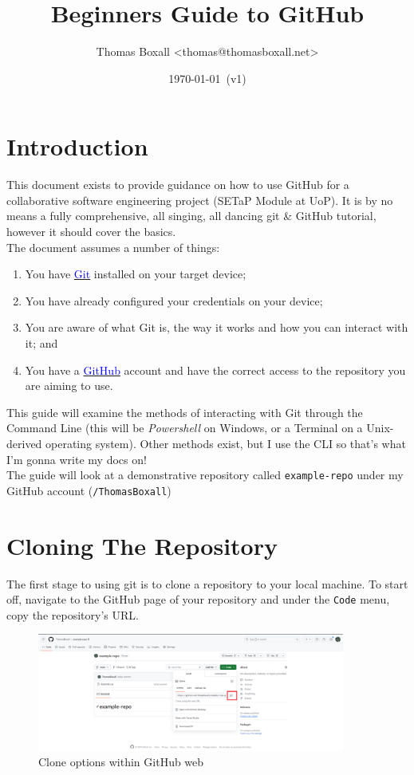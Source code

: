 \documentclass[a4paper, 11pt]{article}
\title{Beginners Guide to GitHub}
\date{\today\ (v1)}
\author{Thomas Boxall <thomas@thomasboxall.net>}
\begin{document}
\maketitle

\section{Introduction}

This document exists to provide guidance on how to use GitHub for a collaborative software engineering project (SETaP Module at UoP). It is by no means a fully comprehensive, all singing, all dancing git \& GitHub tutorial, however it should cover the basics.\\

The document assumes a number of things:
\begin{enumerate}
    \item You have \href{https://git-scm.com/downloads}{\textcolor{blue}{Git}} installed on your target device;
    \item You have already configured your credentials on your device;
    \item You are aware of what Git is, the way it works and how you can interact with it; and
    \item You have a \href{https://github.com}{\textcolor{blue}{GitHub}} account and have the correct access to the repository you are aiming to use.
\end{enumerate}

This guide will examine the methods of interacting with Git through the Command Line (this will be \textit{Powershell} on Windows, or a Terminal on a Unix-derived operating system). Other methods exist, but I use the CLI so that's what I'm gonna write my docs on!\\

The guide will look at a demonstrative repository called \verb|example-repo| under my GitHub account (\verb|/ThomasBoxall|)

\section{Cloning The Repository}
The first stage to using git is to clone a repository to your local machine. To start off, navigate to the GitHub page of your repository and under the \verb|Code| menu, copy the repository's URL.
\begin{figure}[H]
    \centering
    \includegraphics[width=0.9\textwidth]{assets/gitclone.png}
    \caption{Clone options within GitHub web}
\end{figure}
\end{document}
